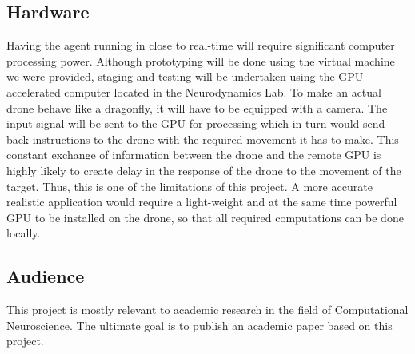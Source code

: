 \documentclass[a4paper,11pt]{article}
\begin{document}
\subsection{Hardware}
Having the agent running in close to real-time will require significant computer processing power. Although prototyping will be done using the virtual machine we were provided, staging and testing will be undertaken using the GPU-accelerated computer located in the Neurodynamics Lab. To make an actual drone behave like a dragonfly, it will have to be equipped with a camera. The input signal will be sent to the GPU for processing which in turn would send back instructions to the drone with the required movement it has to make. This constant exchange of information between the drone and the remote GPU is highly likely to create delay in the response of the drone to the movement of the target. Thus, this is one of the limitations of this project. A more accurate realistic application would require a light-weight and at the same time powerful GPU to be installed on the drone, so that all required computations can be done locally. 

\subsection{Audience}
This project is mostly relevant to academic research in the field of Computational Neuroscience. The ultimate goal is to publish an academic paper based on this project.


{}

\end{document}
